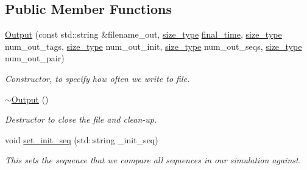 \subsection*{Public Member Functions}
\begin{DoxyCompactItemize}
\item 
\hyperlink{classretrocombinator_1_1Output_ac4dcc9e837413d0669f5b943f8d82dde}{Output} (const std\+::string \&filename\+\_\+out, \hyperlink{namespaceretrocombinator_a8e1541b50cee66a791df4c437ccbb385}{size\+\_\+type} \hyperlink{classretrocombinator_1_1Output_a94f5e60b0aafcc409c78507c5e34ba7a}{final\+\_\+time}, \hyperlink{namespaceretrocombinator_a8e1541b50cee66a791df4c437ccbb385}{size\+\_\+type} num\+\_\+out\+\_\+tags, \hyperlink{namespaceretrocombinator_a8e1541b50cee66a791df4c437ccbb385}{size\+\_\+type} num\+\_\+out\+\_\+init, \hyperlink{namespaceretrocombinator_a8e1541b50cee66a791df4c437ccbb385}{size\+\_\+type} num\+\_\+out\+\_\+seqs, \hyperlink{namespaceretrocombinator_a8e1541b50cee66a791df4c437ccbb385}{size\+\_\+type} num\+\_\+out\+\_\+pair)
\begin{DoxyCompactList}\small\item\em Constructor, to specify how often we write to file. \end{DoxyCompactList}\item 
\mbox{\label{classretrocombinator_1_1Output_a61d0840daf98bea49e4dc471f235eeab}} 
\hyperlink{classretrocombinator_1_1Output_a61d0840daf98bea49e4dc471f235eeab}{$\sim$\+Output} ()
\begin{DoxyCompactList}\small\item\em Destructor to close the file and clean-\/up. \end{DoxyCompactList}\item 
\mbox{\label{classretrocombinator_1_1Output_a5feb518230443e8259aeb3b12ecae437}} 
void \hyperlink{classretrocombinator_1_1Output_a5feb518230443e8259aeb3b12ecae437}{set\+\_\+init\+\_\+seq} (std\+::string \+\_\+init\+\_\+seq)
\begin{DoxyCompactList}\small\item\em This sets the sequence that we compare all sequences in our simulation against. \end{DoxyCompactList}\item 
\mbox{\label{classretrocombinator_1_1Output_a210fa5a86077912c8cf95d15603c1ad2}} 

\end{DoxyCompactItemize}
